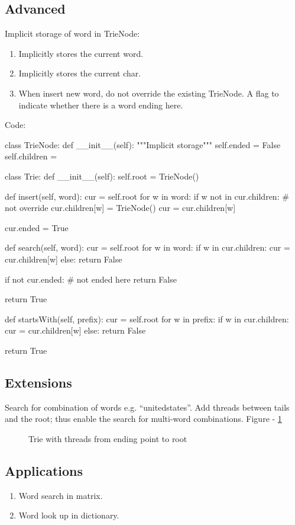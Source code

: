 \subsection{Advanced}
Implicit storage of word in TrieNode: 
\begin{enumerate}
\item Implicitly stores the current word. 
\item Implicitly stores the current char. 
\item When insert new word, do not override the existing TrieNode. A flag to indicate
whether there is a word ending here.
\end{enumerate}
\newpage
Code:
\begin{python}
class TrieNode:
    def __init__(self):
        """Implicit storage"""
        self.ended = False
        self.children = {}


class Trie:
    def __init__(self):
        self.root = TrieNode()

    def insert(self, word):
        cur = self.root
        for w in word:
            if w not in cur.children:   # not override
                cur.children[w] = TrieNode()
            cur = cur.children[w]

        cur.ended = True

    def search(self, word):
        cur = self.root
        for w in word:
            if w in cur.children:
                cur = cur.children[w]
            else:
                return False

        if not cur.ended:  # not ended here
            return False

        return True

    def startsWith(self, prefix):
        cur = self.root
        for w in prefix:
            if w in cur.children:
                cur = cur.children[w]
            else:
                return False

        return True
\end{python}
\subsection{Extensions}
 Search for combination of words e.g. ``unitedstates''. Add threads between tails and the root; thus enable the search for multi-word combinations. Figure - \ref{fig:trie2}
\begin{figure}[!hbt]
\centering
{}
\caption{Trie with threads from ending point to root}
\label{fig:trie2}
\end{figure}
\subsection{Applications}
\begin{enumerate}
\item Word search in matrix.
\item Word look up in dictionary.
\end{enumerate}
        
     
